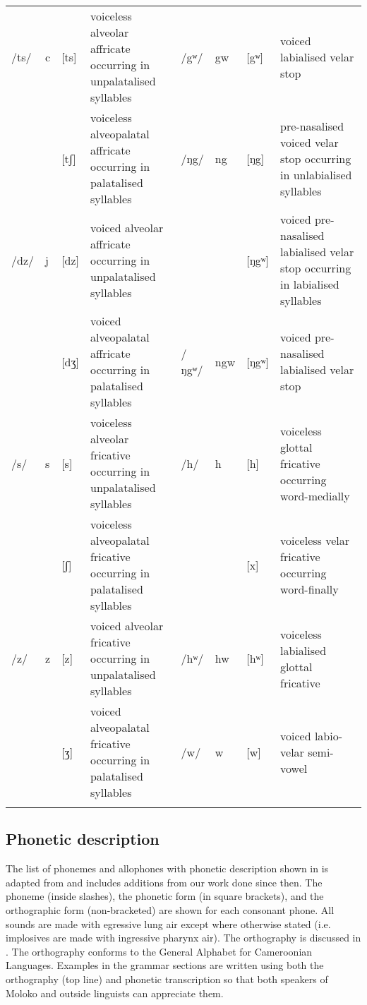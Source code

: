 \begin{table}
{\begin{tabularx}{\textheight}{lllX@{\hspace{2.5em}}lllX}
/ts/&   c  & [ts]&     voiceless alveolar affricate occurring in unpalatalised syllables & /gʷ/ & gw & [gʷ]  &  voiced labialised velar stop    \\
	&      & [tʃ] &     voiceless alveopalatal affricate occurring in palatalised syllables &/ŋg/ &   ng & [ŋg] &   pre-nasalised voiced velar stop occurring in unlabialised syllables\\
/dz/&   j  & [dz] &     voiced alveolar affricate occurring in unpalatalised syllables &     &      & [ŋgʷ] &   voiced pre-nasalised labialised velar stop occurring in labialised syllables\\
    &      & [dʒ] &     voiced alveopalatal affricate occurring in palatalised syllables\ & /ŋgʷ/  & ngw &  [ŋgʷ] &   voiced pre-nasalised labialised velar stop\\
/s/ &   s  & [s] &     voiceless alveolar fricative occurring in unpalatalised syllables & /h/ &   h & [h]  &  voiceless glottal fricative occurring word-medially\\
    &      & [ʃ] &     voiceless alveopalatal fricative occurring in palatalised syllables &     &     & [x]  & voiceless velar fricative occurring word-finally  \\
/z/ &   z  & [z] &     voiced alveolar fricative occurring in unpalatalised syllables & /hʷ/ & hw & [hʷ]  &  voiceless labialised glottal fricative    \\    
    &      & [ʒ] &     voiced alveopalatal fricative occurring in palatalised syllables & /w/ &   w & [w]  & voiced labio-velar semi-vowel\\
   \lspbottomrule
\end{tabularx}}
\end{table}


\subsection{Phonetic description}\label{sec:2.2.1}%
\hypertarget{RefHeading1210461525720847}{}
The list of phonemes and allophones with phonetic description shown in  is adapted from \citet{Bow1997c} and includes additions from our work done since then. The phoneme (inside slashes), the phonetic form (in square brackets), and the orthographic form (non-bracketed) are shown for each consonant phone. All sounds are made with egressive lung air except where otherwise stated (i.e. implosives are made with ingressive pharynx air). The orthography is discussed in \citet{Friesen2001}. The orthography conforms to the General Alphabet for Cameroonian Languages. Examples in the grammar sections are written using both the orthography (top line) and phonetic transcription so that both speakers of Moloko and outside linguists can appreciate them. 

